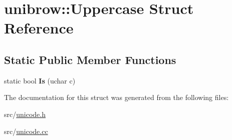 \hypertarget{structunibrow_1_1_uppercase}{}\section{unibrow\+:\+:Uppercase Struct Reference}
\label{structunibrow_1_1_uppercase}
\subsection*{Static Public Member Functions}
\begin{DoxyCompactItemize}
\item 
\hypertarget{structunibrow_1_1_uppercase_aa37be30817948f9926a099bc60a45973}{}static bool {\bfseries Is} (uchar c)\label{structunibrow_1_1_uppercase_aa37be30817948f9926a099bc60a45973}

\end{DoxyCompactItemize}


The documentation for this struct was generated from the following files\+:\begin{DoxyCompactItemize}
\item 
src/\hyperlink{unicode_8h}{unicode.\+h}\item 
src/\hyperlink{unicode_8cc}{unicode.\+cc}\end{DoxyCompactItemize}
